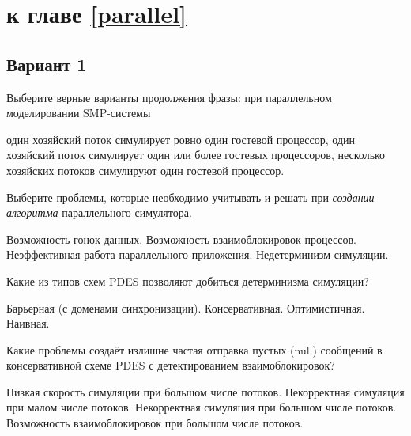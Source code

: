 
\section{\Questions к главе \ref{parallel}} %

\subsection*{Вариант 1}

\begin{questions}

\question[3] Выберите верные варианты продолжения фразы: при параллельном моделировании SMP-системы
\begin{choices}
    \choice один хозяйский поток симулирует ровно один гостевой процессор,
    \correctchoice один хозяйский поток симулирует один или более гостевых процессоров,
    \choice несколько хозяйских потоков симулируют один гостевой процессор.
\end{choices}

\question[3] Выберите проблемы, которые необходимо учитывать и решать при \textit{создании алгоритма} параллельного симулятора.
\begin{choices}
    \correctchoice Возможность гонок данных.
    \correctchoice Возможность взаимоблокировок процессов.
    \choice Неэффективная работа параллельного приложения.
    \choice Недетерминизм симуляции.
\end{choices}

\question[3] Какие из типов схем PDES позволяют добиться детерминизма симуляции?
\begin{choices}
    \correctchoice Барьерная (с доменами синхронизации).
    \choice Консервативная.
    \choice Оптимистичная.
    \choice Наивная.
\end{choices}

\question[3] Какие проблемы создаёт излишне частая отправка пустых (null) сообщений в консервативной схеме PDES с детектированием взаимоблокировок?
\begin{choices}
    \correctchoice Низкая скорость симуляции при большом числе потоков.
    \choice Некорректная симуляция при малом числе потоков.
    \choice Некорректная симуляция при большом числе потоков.
    \choice Возможность взаимоблокировок при большом числе потоков.
\end{choices}


\end{questions}
